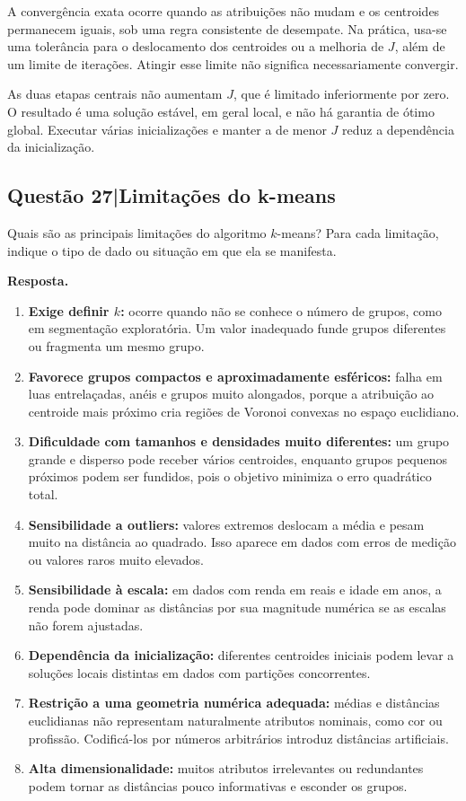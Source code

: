 \documentclass[11pt,a4paper]{article}
\newcommand{\questao}[2]{\Needspace{8\baselineskip}\subsection*{\textcolor{ink}{Questão #1\enspace|\enspace #2}}\addcontentsline{toc}{subsection}{Questão #1 — #2}}
\begin{document}
A convergência exata ocorre quando as atribuições não mudam e os centroides permanecem iguais, sob uma regra consistente de desempate. Na prática, usa-se uma tolerância para o deslocamento dos centroides ou a melhoria de $J$, além de um limite de iterações. Atingir esse limite não significa necessariamente convergir.

As duas etapas centrais não aumentam $J$, que é limitado inferiormente por zero. O resultado é uma solução estável, em geral local, e não há garantia de ótimo global. Executar várias inicializações e manter a de menor $J$ reduz a dependência da inicialização.
\questao{27}{Limitações do k-means}
\begin{enunciado}
    Quais são as principais limitações do algoritmo $k$-means? Para cada limitação, indique o tipo de dado ou situação em que ela se manifesta.
\end{enunciado}
\textbf{Resposta.}
\begin{enumerate}
    \item \textbf{Exige definir $k$:} ocorre quando não se conhece o número de grupos, como em segmentação exploratória. Um valor inadequado funde grupos diferentes ou fragmenta um mesmo grupo.
    \item \textbf{Favorece grupos compactos e aproximadamente esféricos:} falha em luas entrelaçadas, anéis e grupos muito alongados, porque a atribuição ao centroide mais próximo cria regiões de Voronoi convexas no espaço euclidiano.
    \item \textbf{Dificuldade com tamanhos e densidades muito diferentes:} um grupo grande e disperso pode receber vários centroides, enquanto grupos pequenos próximos podem ser fundidos, pois o objetivo minimiza o erro quadrático total.
    \item \textbf{Sensibilidade a outliers:} valores extremos deslocam a média e pesam muito na distância ao quadrado. Isso aparece em dados com erros de medição ou valores raros muito elevados.
    \item \textbf{Sensibilidade à escala:} em dados com renda em reais e idade em anos, a renda pode dominar as distâncias por sua magnitude numérica se as escalas não forem ajustadas.
    \item \textbf{Dependência da inicialização:} diferentes centroides iniciais podem levar a soluções locais distintas em dados com partições concorrentes.
    \item \textbf{Restrição a uma geometria numérica adequada:} médias e distâncias euclidianas não representam naturalmente atributos nominais, como cor ou profissão. Codificá-los por números arbitrários introduz distâncias artificiais.
    \item \textbf{Alta dimensionalidade:} muitos atributos irrelevantes ou redundantes podem tornar as distâncias pouco informativas e esconder os grupos.
\end{enumerate}
\end{document}
